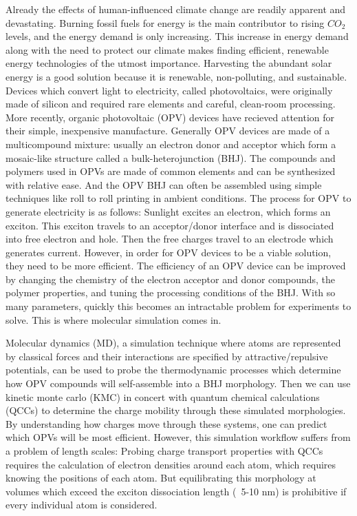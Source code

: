 Already the effects of human-influenced climate change are readily apparent and devastating. %
Burning fossil fuels for energy is the main contributor to rising $CO_{2}$ levels, and the energy demand is only increasing.
This increase in energy demand along with the need to protect our climate makes finding efficient, renewable energy technologies of the utmost importance.
Harvesting the abundant solar energy is a good solution because it is renewable, non-polluting, and sustainable.
Devices which convert light to electricity, called photovoltaics, were originally made of silicon and required rare elements and careful, clean-room processing.
More recently, organic photovoltaic (OPV) devices have recieved attention for their simple, inexpensive manufacture.
Generally OPV devices are made of a multicompound mixture: usually an electron donor and acceptor which form a mosaic-like structure called a bulk-heterojunction (BHJ).
The compounds and polymers used in OPVs are made of common elements and can be synthesized with relative ease.
And the OPV BHJ can often be assembled using simple techniques like roll to roll printing in ambient conditions.
The process for OPV to generate electricity is as follows: 
Sunlight excites an electron, which forms an exciton.
This exciton travels to an acceptor/donor interface and is dissociated into free electron and hole.
Then the free charges travel to an electrode which generates current.
However, in order for OPV devices to be a viable solution, they need to be more efficient.
The efficiency of an OPV device can be improved by changing the chemistry of the electron acceptor and donor compounds, the polymer properties, and tuning the processing conditions of the BHJ.
With so many parameters, quickly this becomes an intractable problem for experiments to solve.
This is where molecular simulation comes in.

Molecular dynamics (MD), a simulation technique where atoms are represented by classical forces and their interactions are specified by attractive/repulsive potentials, can be used to probe the thermodynamic processes which determine how OPV compounds will self-assemble into a BHJ morphology.
Then we can use kinetic monte carlo (KMC) in concert with quantum chemical calculations (QCCs) to determine the charge mobility through these simulated morphologies.
By understanding how charges move through these systems, one can predict which OPVs will be most efficient.
However, this simulation workflow suffers from a problem of length scales:
Probing charge transport properties with QCCs requires the calculation of electron densities around each atom, which requires knowing the positions of each atom.
But equilibrating this morphology at volumes which exceed the exciton dissociation length (~5-10 nm) is prohibitive if every individual atom is considered.

